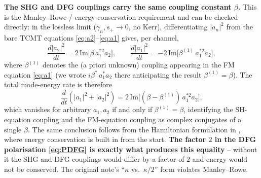 \documentclass[11pt,a4paper]{article}
\begin{document}
\textbf{The SHG and DFG couplings carry the same coupling constant
$\beta$.}  This is the Manley--Rowe / energy-conservation requirement and
can be checked directly: in the lossless limit ($\gamma_n,s_+\!\to 0$, no
Kerr), differentiating $|a_n|^{2}$ from the bare TCMT equations
\eqref{eq:a2}--\eqref{eq:a1} gives, per channel,
\begin{equation}
  \frac{d|a_2|^{2}}{dt}=2\,\mathrm{Im}\bigl[\beta\,a_1^{*2}a_2\bigr],
  \qquad
  \frac{d|a_1|^{2}}{dt}=-2\,\mathrm{Im}\bigl[\beta^{(1)}\,a_1^{*2}a_2\bigr],
  \label{eq:MR-perchannel}
\end{equation}
where $\beta^{(1)}$ denotes the (a priori unknown) coupling appearing
in the FM equation \eqref{eq:a1} (we wrote $i\beta^{*}\,a_1^{*}a_2$
there anticipating the result $\beta^{(1)}=\beta$).  The total
mode-energy rate is therefore
\begin{equation}
  \frac{d}{dt}(|a_1|^{2}+|a_2|^{2})
  =2\,\mathrm{Im}\!\bigl[(\beta-\beta^{(1)})\,a_1^{*2}a_2\bigr],
  \label{eq:MR-total}
\end{equation}
which vanishes for arbitrary $a_1,a_2$ if and only if
$\beta^{(1)}=\beta$, identifying the SH-equation coupling and the
FM-equation coupling as complex conjugates of a single $\beta$.  The
same conclusion follows from the Hamiltonian formulation in
\cite[Eqs.~8--9]{Rodriguez2007}, where energy conservation is built
in from the start.  \textbf{The factor $2$ in the DFG polarisation
\eqref{eq:PDFG} is exactly what produces this equality} -- without
it the SHG and DFG couplings would differ by a factor of $2$ and
energy would not be conserved.  The original note's
``$\kappa$ vs.\ $\kappa/2$'' form violates Manley--Rowe.
\end{document}
